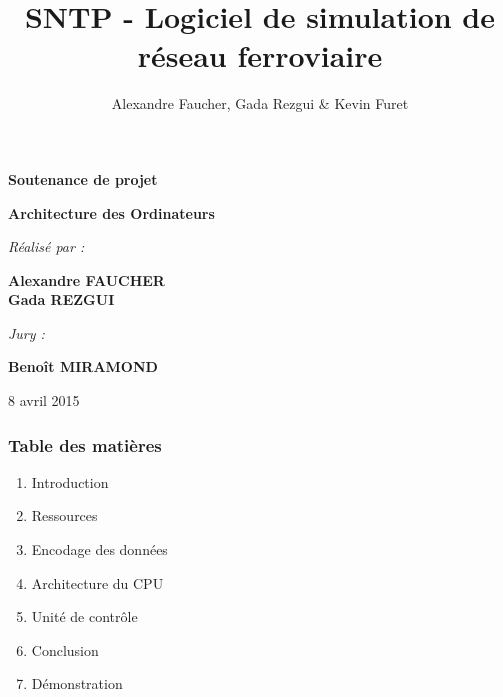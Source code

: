 \documentclass{beamer}
\title{SNTP - Logiciel de simulation de réseau ferroviaire}
\author{Alexandre Faucher, Gada Rezgui \& Kevin Furet}
\begin{document}

\begin{frame}
	\begin{center}

	{\Huge \textbf{Soutenance de projet}}

	\vspace*{0.3cm}

	{\large \textbf{Architecture des Ordinateurs}}

	\vspace*{0.5cm}

	\textit{Réalisé par :}

	{\large \textbf{Alexandre FAUCHER\\ Gada REZGUI}}

	\vspace*{0.5cm}

	\textit{Jury :}

	{\large \textbf{Benoît MIRAMOND}}

	\vspace*{0.5cm}

	{\large 8 avril 2015}

	\end{center}
\end{frame}



\begin{frame}
\frametitle{Table des matières}
\begin{enumerate}
	\item Introduction
	\item Ressources
	\item Encodage des données
	\item Architecture du CPU
	\item Unité de contrôle
	\item Conclusion
	\item Démonstration
\end{enumerate}
\end{frame}

\end{document}
